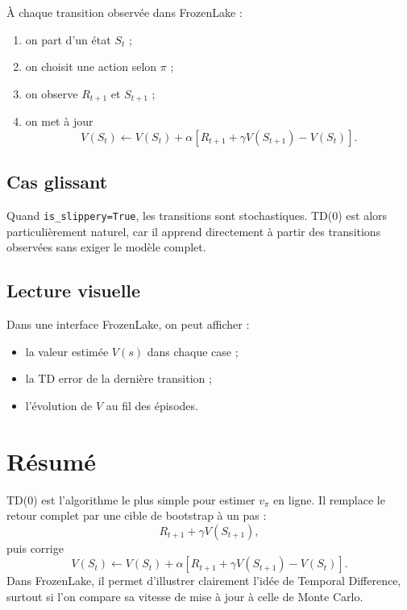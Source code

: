 \documentclass[11pt,a4paper]{article}
\begin{document}
À chaque transition observée dans FrozenLake :
\begin{enumerate}[leftmargin=1.8em]
    \item on part d'un état $S_t$ ;
    \item on choisit une action selon $\pi$ ;
    \item on observe $R_{t+1}$ et $S_{t+1}$ ;
    \item on met à jour
    \[
    V(S_t)\leftarrow V(S_t)+\alpha\left[R_{t+1}+\gamma V(S_{t+1})-V(S_t)\right].
    \]
\end{enumerate}

\subsection{Cas glissant}

Quand \texttt{is\_slippery=True}, les transitions sont stochastiques. TD(0) est alors particulièrement naturel, car il apprend directement à partir des transitions observées sans exiger le modèle complet.

\subsection{Lecture visuelle}

Dans une interface FrozenLake, on peut afficher :
\begin{itemize}[leftmargin=1.6em]
    \item la valeur estimée $V(s)$ dans chaque case ;
    \item la TD error de la dernière transition ;
    \item l'évolution de $V$ au fil des épisodes.
\end{itemize}

\section{Résumé}

TD(0) est l'algorithme le plus simple pour estimer $v_{\pi}$ en ligne. Il remplace le retour complet par une cible de bootstrap à un pas :
\[
R_{t+1}+\gamma V(S_{t+1}),
\]
puis corrige
\[
V(S_t)\leftarrow V(S_t)+\alpha\left[R_{t+1}+\gamma V(S_{t+1})-V(S_t)\right].
\]
Dans FrozenLake, il permet d'illustrer clairement l'idée de Temporal Difference, surtout si l'on compare sa vitesse de mise à jour à celle de Monte Carlo.
\end{document}
